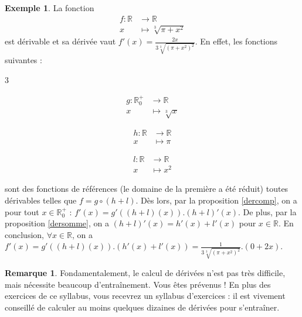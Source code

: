\documentclass[a4paper,fontsize=13pt]{scrreprt}
\theoremstyle{plain}
\theoremstyle{definition}
\newtheorem{exe}[subsection]{Exemple}
\newtheorem{rema}[subsection]{Remarque}
\newcommand{\rr}{\mathbb{R}}
\begin{document}
\begin{exe}
	La fonction
	\begin{align*}
	f  : {\rr} &\to \rr \\
	x &\mapsto \sqrt[3]{\pi+x^2}
	\end{align*}
	est dérivable et sa dérivée vaut $f'(x)=\frac{2x}{3\sqrt[3]{(\pi+x^2)^2}}$. En effet, les fonctions suivantes :
	\begin{itemize}
	\end{itemize}
	sont des fonctions de références (le domaine de la première a été réduit) toutes dérivables telles que $f = g\circ(h+l)$. Dès lors, par la proposition \ref{dercomp}, on a pour tout $x \in \rr^{+}_0$ : $f'(x)=g'((h+l)(x)).(h+l)'(x)$. De plus, par la proposition \ref{dersomme}, on a $(h+l)'(x)=h'(x)+l'(x)$ pour $x \in \rr$. En conclusion, $\forall x \in \rr$, on a $f'(x)=g'((h+l)(x)).(h'(x)+l'(x))=\frac{1}{3\sqrt[3]{(\pi+x^2)^2}}.(0+2x)$.
\end{exe}
\begin{rema}
	Fondamentalement, le calcul de dérivées n'est pas très difficile, mais nécessite beaucoup d'entraînement. Vous êtes prévenus ! En plus des exercices de ce syllabus, vous recevrez un syllabus d'exercices : il est vivement conseillé de calculer au moins quelques dizaines de dérivées pour s'entraîner.
\end{rema}
\end{document}
